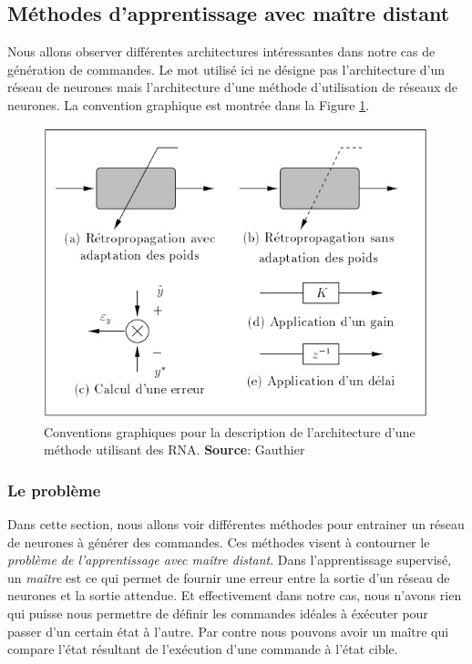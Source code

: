 \subsection{Méthodes d'apprentissage avec maître distant}
Nous allons observer différentes architectures intéressantes dans notre cas de génération de commandes.
Le mot  utilisé ici ne désigne pas l'architecture d'un réseau de neurones mais l'architecture d'une méthode d'utilisation de réseaux de neurones.
La convention graphique est montrée dans la Figure \ref{legendearchi}.
\begin{figure}
 \centering
 \includegraphics[scale=0.6]{../figures/applegende.jpg}
 \caption{Conventions graphiques pour la description de l'architecture d'une méthode utilisant des RNA. \textbf{Source}: Gauthier\cite{Gauthier}}
 \label{legendearchi}
\end{figure}

\subsubsection{Le problème}
Dans cette section, nous allons voir différentes méthodes pour entrainer un réseau de neurones à générer des commandes.
Ces méthodes visent à contourner le \emph{problème de l'apprentissage avec maître distant}.
Dans l'apprentissage supervisé, un \emph{maître} est ce qui permet de fournir une erreur entre la sortie d'un réseau de neurones et la sortie attendue.
Et effectivement dans notre cas, nous n'avons rien qui puisse nous permettre de définir les commandes idéales à éxécuter pour passer d'un certain état à l'autre.
Par contre nous pouvons avoir un maître qui compare l'état résultant de l'exécution d'une commande à l'état cible.

